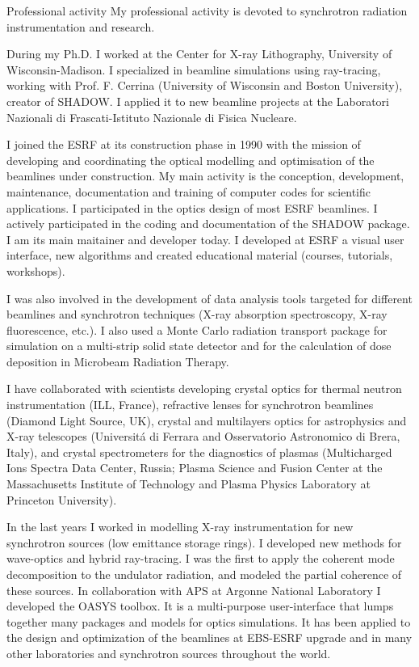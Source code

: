 \begin{rubric}{Professional activity}
My professional activity is devoted to synchrotron radiation
instrumentation and research.

During my Ph.D. I worked at the Center for X-ray Lithography, University of Wisconsin-Madison.
I specialized in beamline simulations using ray-tracing, working with Prof. F. Cerrina (University of Wisconsin and Boston University), creator of SHADOW. I applied it to new beamline projects at the Laboratori Nazionali di Frascati-Istituto Nazionale di Fisica Nucleare.

I joined the ESRF at its construction phase in 1990 with the mission of developing and coordinating the optical modelling and optimisation of the beamlines under construction.
My main activity is the conception, development, maintenance, documentation and training of
computer codes for scientific applications. I participated in the optics design of most ESRF beamlines. I actively participated in the coding and
documentation of the SHADOW package. I am its main maitainer and developer today. I developed at ESRF a visual user interface, new algorithms and
created educational material (courses, tutorials, workshops).

I was also involved in the development of data analysis tools targeted for different beamlines and
synchrotron techniques (X-ray absorption spectroscopy, X-ray fluorescence, etc.). I also used a
Monte Carlo radiation transport package for simulation on a multi-strip solid state detector and for
the calculation of dose deposition in Microbeam Radiation Therapy.

\entry*[]
I have collaborated with scientists developing crystal optics for thermal neutron instrumentation (ILL, France), refractive lenses for synchrotron beamlines (Diamond Light Source, UK), crystal and multilayers optics for
astrophysics and X-ray telescopes (Universit\'a di Ferrara and Osservatorio Astronomico di Brera, Italy), and crystal spectrometers for the diagnostics of plasmas
(Multicharged Ions Spectra Data Center, Russia; Plasma Science and Fusion Center at the Massachusetts Institute of Technology and Plasma Physics Laboratory at Princeton University). 

In the last years I worked in modelling X-ray instrumentation for new synchrotron sources (low emittance storage rings). I developed new methods for wave-optics and hybrid ray-tracing. I was the first to apply the coherent mode decomposition to the undulator radiation, and modeled the partial coherence of these sources. In collaboration with APS at Argonne National Laboratory I developed the OASYS toolbox. It is a multi-purpose user-interface that lumps together many packages and models for optics simulations. It has been applied to the design and optimization of the beamlines at EBS-ESRF upgrade and in many other laboratories and synchrotron sources throughout the world.


\end{rubric}
